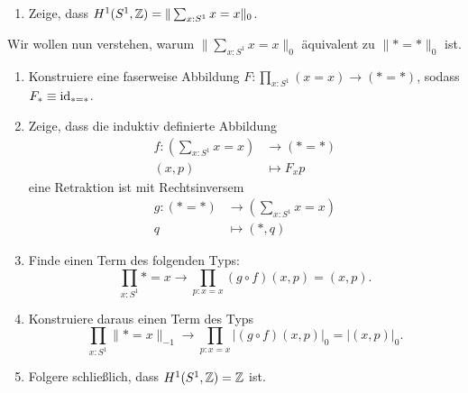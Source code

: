 \documentclass{uebung}
\begin{document}

\begin{exercise}
\end{exercise}

\begin{exercise}
  \begin{enumerate}
    \item Zeige, dass $H^1(S^1,\mathbb{Z}) = \|\sum_{x:S^1} x=x\|_0$.
  \end{enumerate}
  Wir wollen nun verstehen, warum $\|\sum_{x:S^1} x=x\|_0$ äquivalent zu $\|\ast = \ast\|_0$ ist.
  \begin{enumerate}[start=2]
    \item Konstruiere eine faserweise Abbildung $F:\prod_{x:S^1} (x = x) \to (\ast = \ast)$, sodass $F_\ast\equiv\mathrm{id}_{\ast = \ast}$.
    \item Zeige, dass die induktiv definierte Abbildung
      \begin{align*}
        f:\left(\sum_{x:S^1} x=x\right) &\to (\ast=\ast)\\
        (x,p)&\mapsto F_xp
      \end{align*}
      eine Retraktion ist mit Rechtsinversem
      \begin{align*}
        g:(\ast=\ast) &\to \left(\sum_{x:S^1} x=x\right)\\
        q &\mapsto (\ast,q)
      \end{align*}
    \item Finde einen Term des folgenden Typs:
      $$
      \prod_{x:S^1} \ast=x \to \prod_{p:x=x} (g\circ f)(x,p) = (x,p).
      $$
    \item Konstruiere daraus einen Term des Typs
      $$
      \prod_{x:S^1} \|\ast=x\|_{-1} \to \prod_{p:x=x} |(g\circ f)(x,p)|_0 = |(x,p)|_0.
      $$
    \item Folgere schließlich, dass $H^1(S^1,\mathbb{Z}) = \mathbb{Z}$ ist.
  \end{enumerate}
\end{exercise}

\begin{exercise}
\end{exercise}
\end{document}
